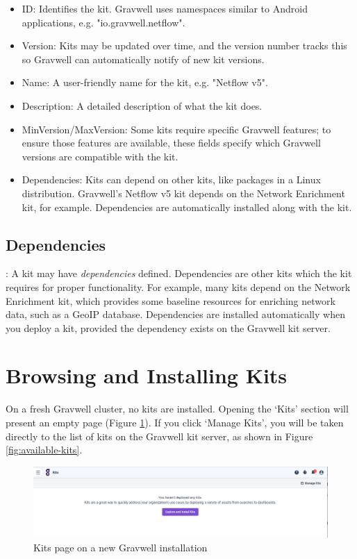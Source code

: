 \begin{itemize}
\tightlist
\item
ID: Identifies the kit. Gravwell uses namespaces similar to Android applications, e.g. "io.gravwell.netflow".
\item
Version: Kits may be updated over time, and the version number tracks this so Gravwell can automatically notify of new kit versions.
\item
Name: A user-friendly name for the kit, e.g. "Netflow v5".
\item
Description: A detailed description of what the kit does.
\item
MinVersion/MaxVersion: Some kits require specific Gravwell features; to ensure those features are available, these fields specify which Gravwell versions are compatible with the kit.
\item
Dependencies: Kits can depend on other kits, like packages in a Linux distribution. Gravwell's Netflow v5 kit depends on the Network Enrichment kit, for example. Dependencies are automatically installed along with the kit.
\end{itemize}

\subsection{Dependencies}
:
A kit may have \emph{dependencies} defined. Dependencies are other kits which the kit requires for proper functionality. For example, many kits depend on the Network Enrichment kit, which provides some baseline resources for enriching network data, such as a GeoIP database. Dependencies are installed automatically when you deploy a kit, provided the dependency exists on the Gravwell kit server.

\section{Browsing and Installing Kits}
On a fresh Gravwell cluster, no kits are installed. Opening the `Kits' section will present an empty page (Figure \ref{fig:blank-kits}). If you click `Manage Kits', you will be taken directly to the list of kits on the Gravwell kit server, as shown in Figure \ref{fig:available-kits}.

\begin{figure}
	\includegraphics[width=0.85\linewidth]{images/blank-kits.png}
	\caption{Kits page on a new Gravwell installation}
	\label{fig:blank-kits}
\end{figure}


